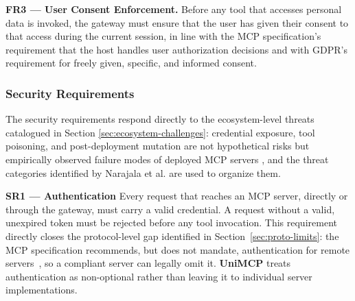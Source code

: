 \documentclass[english, 12pt, a4paper, elec, utf8, a-2b, online]{aaltothesis}
\newcommand{\UniMCP}{\textbf{UniMCP}\xspace}
\begin{document}
\textbf{FR3 --- User Consent Enforcement.}
Before any tool that accesses personal data is invoked, the gateway must ensure that the user has given their consent to that access during the current session, in line with the MCP specification's requirement that the host handles user authorization decisions \cite{mcpspec2026} and with GDPR's requirement for freely given, specific, and informed consent.

\subsubsection{Security Requirements}
The security requirements respond directly to the ecosystem-level threats catalogued in Section \ref{sec:ecosystem-challenges}: credential exposure, tool poisoning, and post-deployment mutation are not hypothetical risks but empirically observed failure modes of deployed MCP
servers \cite{hasan2025mcp, wang2026mcptox, park2026attack}, and the threat categories identified by
Narajala et al. \cite{narajala2025enterprise} are used to organize them.

\textbf{SR1 --- Authentication}
\label{sec: SR1}
Every request that reaches an MCP server, directly or through the gateway, must carry a valid credential. 
A request without a valid, unexpired token must be rejected before any tool invocation.
This requirement directly closes the protocol-level gap identified in Section~\ref{sec:proto-limits}: the MCP specification recommends, but does not mandate, authentication for remote
servers~\cite{mcpspec2026}, so a compliant server can legally omit it. \UniMCP treats authentication as
non-optional rather than leaving it to individual server implementations.
\end{document}
